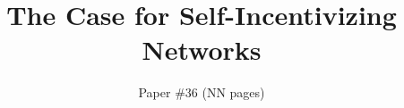 \documentclass{hotnets15}
\begin{document}
 {}
\date{}


\title{The Case for Self-Incentivizing Networks}

\author{Paper \#36 (NN pages)}

\maketitle










 
\begin{small}

\end{small}
\label{last-page}
\end{document}
